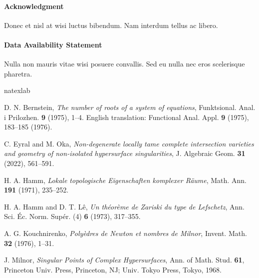 \documentclass{CUP-JNL-NMJ}%
\theoremstyle{cupplain}
\theoremstyle{cupremark}
\theoremstyle{cupdefinition}
\theoremstyle{cupproof}
\numberwithin{equation}{section}
\begin{document}
\begin{Backmatter}
\paragraph{Acknowledgment}
Donec et nisl at wisi luctus bibendum. Nam interdum tellus ac libero.
\paragraph{Data Availability Statement}
Nulla non mauris vitae wisi posuere convallis. Sed eu nulla nec eros scelerisque pharetra.

\def\refname{References}
\begin{thebibliography}{99}
\expandafter\ifx\csname natexlab\endcsname\relax\def\natexlab#1{#1}\fi
\def\au#1{#1} \def\ed#1{#1} \def\yr#1{#1}\def\at#1{#1}\def\jt#1{{#1}}
\def\bt#1{#1}\def\bvol#1{\textbf{#1}} \def\vol#1{#1} \def\pg#1{#1}
\def\publ#1{#1}\def\arxiv#1{#1}\def\org#1{#1}\def\st#1{\textit{#1}}
\item[]\hspace*{-1.5pc}{This is a sample reference list, please use this to style your references.}
\hypertarget{r1}{}
{\au{D. N. {Bernstein}}},  \at{\textit{The number of roots of a system of equations}},  \jt{Funktsional. Anal. i Prilozhen.} \bvol{9} (\yr{1975}),  \pg{{1}--{4}}. English translation: Functional Anal. Appl. \textbf{9} (1975), 183--185 (1976).


\hypertarget{r2}{}
{\au{C. {Eyral}} and \au{M. {Oka}}}, \textit{Non-degenerate locally tame complete intersection varieties and geometry of non-isolated hypersurface singularities}, J. Algebraic Geom. \bvol{31} (\yr{2022}),  \pg{{561}--{591}}.


\hypertarget{r3}{}
{\au{H. A. {Hamm}}},  \at{\textit{Lokale topologische Eigenschaften komplexer R\"{a}ume}},  \jt{Math. Ann.} \bvol{191} (\yr{1971}),  \pg{{235}--{252}}.


\hypertarget{r4}{}
{\au{H. A. {Hamm}} and \au{D. T. {L\^{e}}}},  \at{\textit{Un th\'{e}or\`{e}me de Zariski du type de Lefschetz}},  \jt{Ann. Sci. \'{E}c. Norm. Sup\'{e}r. (4)} \bvol{6} (\yr{1973}),  \pg{{317}--{355}}.


\hypertarget{r5}{}
{\au{A. G. {Kouchnirenko}}},  \at{\textit{Poly\`{e}dres de Newton et nombres de Milnor}},  \jt{Invent. Math.} \bvol{32} (\yr{1976}),  \pg{{1}--{31}}.


\hypertarget{r6}{}
{\au{J. {Milnor}}},  \jt{\textit{Singular Points of Complex Hypersurfaces}}, Ann. of Math. Stud. \textbf{61},  \publ{Princeton Univ. Press}, 
 \publ{Princeton, NJ}; Univ. Tokyo Press, Tokyo, \yr{1968}.



\end{thebibliography}
\end{Backmatter}
\end{document}

